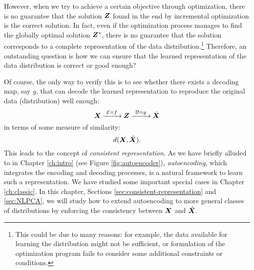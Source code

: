 \documentclass[\toplevelprefix/book-main.tex]{subfiles}
\begin{document}
However, when we try to achieve a certain objective through
optimization, there is no guarantee that the solution $\bm{Z}$ found in
the end by incremental optimization is the correct solution. In fact, even if
the optimization process manages to find the globally optimal
solution $\bm{Z}^*$, there is no guarantee that the solution corresponds
to a complete representation of the data distribution.\footnote{This could be due to many reasons: for example, the data available for learning the distribution might not be sufficient, or formulation of the optimization program fails to consider some additional constraints or conditions.} Therefore, an outstanding question is how we can ensure that the learned representation of the data distribution is
correct or good enough? 

Of course, the only way to verify this is to see whether there exists a decoding map, say $g$, that can decode the learned representation to reproduce the original data (distribution) well enough:
\begin{equation}
  \bm{X}
  \xrightarrow{\hspace{1mm} \mathcal{E} = f \hspace{1mm}} \bm{Z}
  \xrightarrow{\hspace{1mm} \mathcal{D} = g \hspace{1mm}} \hat{\bm{X}}
\end{equation}
in terms of some measure of similarity:
\begin{equation}
  d(\bm{X}, \hat {\bm{X}}).
\end{equation}
This leads to the concept of {\em consistent representation}. As we have briefly alluded to in
Chapter \ref{ch:intro} (see Figure \ref{fig:autoencoder}), {\em autoencoding}, which integrates the
encoding and decoding processes, is a natural framework to learn such a representation. We have studied some important special cases in Chapter \ref{ch:classic}. In
this chapter, Sections \ref{sec:consistent-representation} and \ref{sec:NLPCA}, we will study how to extend autoencoding to
more general classes of distributions by enforcing the consistency between $\bm{X}$ and $\hat {\bm{X}}$.
\end{document}
